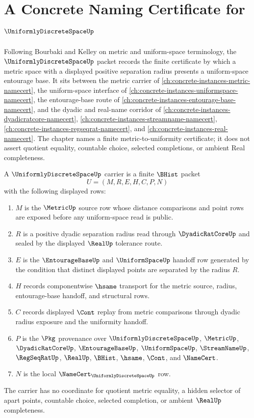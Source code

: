 \chapter{A Concrete Naming Certificate for $\UniformlyDiscreteSpaceUp$}
\label{ch:concrete-instances-uniformly-discrete-space-namecert}

Following Bourbaki and Kelley on metric and uniform-space terminology, the $\UniformlyDiscreteSpaceUp$ packet records the finite certificate by which a metric space with a displayed positive separation radius presents a uniform-space entourage base. It sits between the metric carrier of \autoref{ch:concrete-instances-metric-namecert}, the uniform-space interface of \autoref{ch:concrete-instances-uniformspace-namecert}, the entourage-base route of \autoref{ch:concrete-instances-entourage-base-namecert}, and the dyadic and real-name corridor of \autoref{ch:concrete-instances-dyadicratcore-namecert}, \autoref{ch:concrete-instances-streamname-namecert}, \autoref{ch:concrete-instances-regseqrat-namecert}, and \autoref{ch:concrete-instances-real-namecert}. The chapter names a finite metric-to-uniformity certificate; it does not assert quotient equality, countable choice, selected completions, or ambient Real completeness.

\begin{definition}
\label{def:uniformly-discrete-space-carrier}
A $\UniformlyDiscreteSpaceUp$ carrier is a finite $\BHist$ packet
$$
U=(M,R,E,H,C,P,N)
$$
with the following displayed rows:
\begin{enumerate}
\item $M$ is the $\MetricUp$ source row whose distance comparisons and point rows are exposed before any uniform-space read is public.
\item $R$ is a positive dyadic separation radius read through $\DyadicRatCoreUp$ and sealed by the displayed $\RealUp$ tolerance route.
\item $E$ is the $\EntourageBaseUp$ and $\UniformSpaceUp$ handoff row generated by the condition that distinct displayed points are separated by the radius $R$.
\item $H$ records componentwise $\hsame$ transport for the metric source, radius, entourage-base handoff, and structural rows.
\item $C$ records displayed $\Cont$ replay from metric comparisons through dyadic radius exposure and the uniformity handoff.
\item $P$ is the $\Pkg$ provenance over $\UniformlyDiscreteSpaceUp$, $\MetricUp$, $\DyadicRatCoreUp$, $\EntourageBaseUp$, $\UniformSpaceUp$, $\StreamNameUp$, $\RegSeqRatUp$, $\RealUp$, $\BHist$, $\hsame$, $\Cont$, and $\NameCert$.
\item $N$ is the local $\NameCert_{\UniformlyDiscreteSpaceUp}$ row.
\end{enumerate}
The carrier has no coordinate for quotient metric equality, a hidden selector of apart points, countable choice, selected completion, or ambient $\RealUp$ completeness.
\end{definition}

